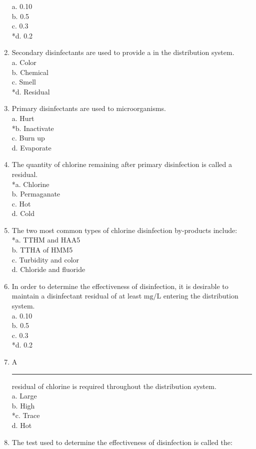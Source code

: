 \begin{enumerate}[1.]
a. 0.10\\
b. 0.5\\
c. 0.3\\
*d. 0.2\\
\item Secondary disinfectants are used to provide a in the distribution system.\\
a. Color\\
b. Chemical\\
c. Smell\\
*d. Residual\\
\item Primary disinfectants are used to microorganisms.\\
a. Hurt\\
*b. Inactivate\\
c. Burn up\\
d. Evaporate\\
\item The quantity of chlorine remaining after primary disinfection is called a residual.\\
*a. Chlorine\\
b. Permaganate\\
c. Hot\\
d. Cold\\
\item The two most common types of chlorine disinfection by-products include:\\
*a. TTHM and HAA5\\
b. TTHA of HMM5\\
c. Turbidity and color\\
d. Chloride and fluoride\\
\item In order to determine the effectiveness of disinfection, it is desirable to maintain a disinfectant residual of at least $\mathrm{mg} / \mathrm{L}$ entering the distribution system.\\
a. 0.10\\
b. 0.5\\
c. 0.3\\
*d. 0.2\\
\item A \rule{1.5cm}{0.5pt} residual of chlorine is required throughout the distribution system.\\
a. Large\\
b. High\\
*c. Trace\\
d. Hot\\
\item The test used to determine the effectiveness of disinfection is called the:\\

\end{enumerate}
